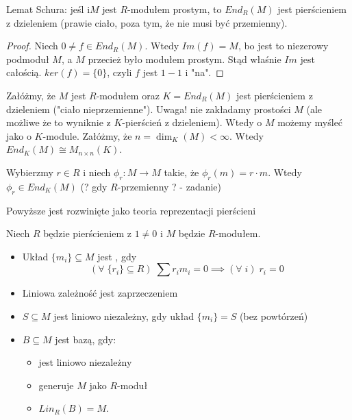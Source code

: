 \begin{lemma} Lemat Schura: jeśl i$M$ jest $R$-modułem prostym, to $End_R(M)$ jest pierścieniem z dzieleniem (prawie ciało, poza tym, że nie musi być przemienny).
\end{lemma}
\begin{proof}
Niech $0\neq f\in End_R(M)$. Wtedy $Im(f)=M$, bo jest to niezerowy podmoduł $M$, a $M$ przecież było modułem prostym. Stąd właśnie $Im$ jest całością. $ker(f)=\{0\}$, czyli $f$ jest $1-1$ i "na".
\end{proof}

Załóżmy, że $M$ jest $R$-modułem oraz $K=End_R(M)$ jest pierścieniem z dzieleniem ("ciało nieprzemienne"). Uwaga! nie zakładamy prostości $M$ (ale możliwe że to wyniknie z $K$-pierścień z dzieleniem). Wtedy o $M$ możemy myśleć jako o $K$-module. Załóżmy, że $n=\dim_K(M)<\infty$. Wtedy $End_K(M)\cong M_{n\times n}(K)$.

Wybierzmy $r\in R$ i niech $\phi_r:M\to M$ takie, że $\phi_r(m)=r\cdot m$. Wtedy $\phi_r\in End_K(M)$ (? gdy $R$-przemienny ? - zadanie)

\begin{center}\end{center}

Powyższe jest rozwinięte jako teoria reprezentacji pierścieni

\setcounter{section}{11}


\begin{bbox}
Niech $R$ będzie pierścieniem z $1\neq 0$ i $M$ będzie $R$-modułem.

\begin{itemize}%
    \item[\PHtunny] Układ $\{m_i\}\subseteq M$ jest , gdy
    $$(\forall\;\{r_i\}\subseteq R)\;\sum r_im_i=0\implies(\forall\;i)\;r_i=0$$
    \item[\PHtunny] Liniowa zależność jest zaprzeczeniem
    \item[\PHtunny] $S\subseteq M$ jest liniowo niezależny, gdy układ $\{m_i\}=S$ (bez powtórzeń)
    \item[\PHtunny] $B\subseteq M$ jest bazą, gdy:
    \begin{itemize}
        \item jest liniowo niezależny
        \item generuje $M$ jako $R$-moduł
        \item $Lin_R(B)=M$.
    \end{itemize}
\end{itemize}

\end{bbox}

